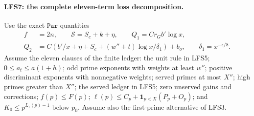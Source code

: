 \paragraph{LFS7: the complete eleven-term loss decomposition.}
\label{claim:LFS7}
Use the exact $\texttt{Par}$ quantities
\begin{equation}
\begin{aligned}
 f&=2n,\qquad\mathcal S=S_c+k+\eta,\qquad
 Q_1=Cr_Gb'\log x,\\
 Q_2&=C\left(b'/x+\eta+S_c+(w''+t)\log x/\delta_1\right)+b_o,
 \qquad\delta_1=x^{-\epsilon/8}.
\end{aligned}                                             \tag{LFS.13}
\end{equation}
Assume the eleven clauses of the finite ledger:
the unit rule in LFS5; $0\le a_t\le a(1+h)$;
odd prime exponents with weights at least $w''$;
positive discriminant exponents with nonnegative weights;
served primes at most $X''$; high primes greater than $X''$;
the served ledger in LFS5; zero unserved gains and corrections;
$f(p)\le F(p)$; $\ell(p)\le C_p+\mathbf1_{p<X}(P_p+O_p)$;
and $K_0\le p^{L_1(p)-1}$ below $p_0$.
Assume also the first-prime alternative of LFS3.

